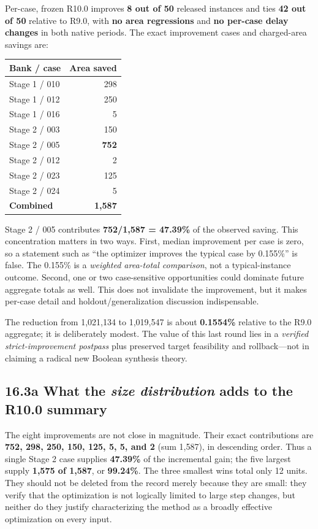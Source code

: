 Per-case, frozen R10.0 improves \textbf{8 out of 50} released instances and ties \textbf{42 out of 50} relative to R9.0, with \textbf{no area regressions} and \textbf{no per-case delay changes} in both native periods. The exact improvement cases and charged-area savings are:

\begin{longtable}[]{@{}lr@{}}
\toprule\noalign{}
Bank / case & Area saved \\
\midrule\noalign{}
\endhead
\bottomrule\noalign{}
\endlastfoot
Stage 1 / 010 & 298 \\
Stage 1 / 012 & 250 \\
Stage 1 / 016 & 5 \\
Stage 2 / 003 & 150 \\
Stage 2 / 005 & \textbf{752} \\
Stage 2 / 012 & 2 \\
Stage 2 / 023 & 125 \\
Stage 2 / 024 & 5 \\
\textbf{Combined} & \textbf{1,587} \\
\end{longtable}

Stage 2 / 005 contributes \textbf{752/1,587 = 47.39\%} of the observed saving. This concentration matters in two ways. First, median improvement per case is zero, so a statement such as ``the optimizer improves the typical case by 0.155\%'' is false. The 0.155\% is a \emph{weighted area-total comparison}, not a typical-instance outcome. Second, one or two case-sensitive opportunities could dominate future aggregate totals as well. This does not invalidate the improvement, but it makes per-case detail and holdout/generalization discussion indispensable.

The reduction from 1,021,134 to 1,019,547 is about \textbf{0.1554\%} relative to the R9.0 aggregate; it is deliberately modest. The value of this last round lies in a \emph{verified strict-improvement postpass} plus preserved target feasibility and rollback---not in claiming a radical new Boolean synthesis theory.

\subsection{\texorpdfstring{16.3a What the \emph{size distribution} adds to the R10.0 summary}{16.3a What the size distribution adds to the R10.0 summary}}\label{a-what-the-size-distribution-adds-to-the-r10.0-summary}

The eight improvements are not close in magnitude. Their exact contributions are \textbf{752, 298, 250, 150, 125, 5, 5, and 2} (sum 1,587), in descending order. Thus a single Stage 2 case supplies \textbf{47.39\%} of the incremental gain; the five largest supply \textbf{1,575 of 1,587}, or \textbf{99.24\%}. The three smallest wins total only 12 units. They should not be deleted from the record merely because they are small: they verify that the optimization is not logically limited to large step changes, but neither do they justify characterizing the method as a broadly effective optimization on every input.

